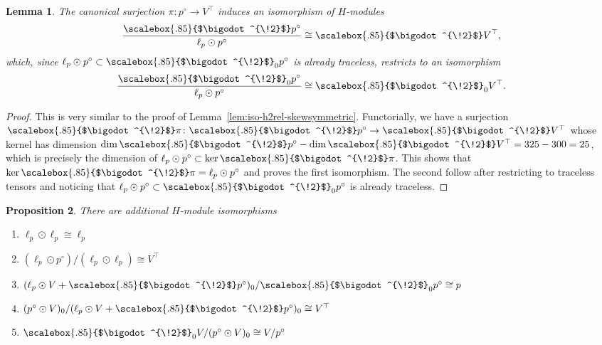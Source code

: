 \documentclass[11pt,reqno,a4paper,final]{amsart}
\newcommand\sym[1]{\scalebox{.85}{$\bigodot^{\!#1}$}}
\theoremstyle{plain}
\newtheorem{lemma}{Lemma}
\newtheorem{proposition}[lemma]{Proposition}
\theoremstyle{definition}
\newcommand{\1}{\mathbb{1}}
\numberwithin{equation}{section}
\begin{document}
\begin{lemma}
  \label{lem:iso-h2rel-symmetric-submodule}
  The canonical surjection $\pi : p^\circ \to V^\top$ induces an isomorphism of $H$-modules
  \begin{equation}
    \dfrac{\sym{2}p^\circ}{\ell_p \odot p^\circ} \cong \sym{2} V^\top,
  \end{equation}
  which, since $\ell_p\odot p^\circ \subset \sym{2}_0 p^\circ$ is already
  traceless, restricts to an isomorphism
  \begin{equation}
    \dfrac{\sym{2}_0p^\circ}{\ell_p \odot p^\circ} \cong \sym{2}_0 V^\top.
  \end{equation}
\end{lemma}

\begin{proof}
  This is very similar to the proof of
  Lemma~\ref{lem:iso-h2rel-skewsymmetric}.  Functorially, we have a
  surjection
  $\sym{2}\pi \colon \sym{2} p^\circ\to \sym{2} V^\top$ whose
  kernel has dimension
  $\dim \sym{2} p^\circ - \dim \sym{2} V^\top = 325 - 300 = 25$,
  which is precisely the dimension of
  $\ell_p \odot p^\circ \subset \ker \sym{2} \pi$.  This shows that
  $\ker \sym{2} \pi = \ell_p \odot p^\circ$ and proves the first
  isomorphism.  The second follow after restricting to traceless
  tensors and noticing that $\ell_p \odot p^\circ \subset \sym{2}_0
  p^\circ$ is already traceless.
\end{proof}


\begin{proposition}
  \label{prop:assoc-graded-symmetric-modules}
  There are additional $H$-module isomorphisms
  \begin{enumerate}
  \item $\ell_p \odot \ell_p \cong \ell_p$
  \item $(\ell_p \odot p^\circ)/(\ell_p \odot \ell_p) \cong V^\top$
  \item $(\ell_p \odot V + \sym{2}p^\circ)_0/\sym{2}_0 p^\circ \cong p$
  \item $(p^\circ \odot V)_0/(\ell_p \odot V + \sym{2}p^\circ)_0 \cong V^\top$
  \item $\sym{2}_0 V/(p^\circ \odot V)_0 \cong V/p^\circ$
  \end{enumerate}
\end{proposition}
\end{document}
